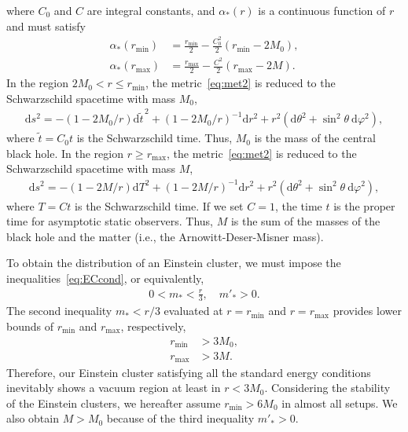 \documentclass[aps,11pt,nofootinbib,preprintnumbers,groupedaddress,superscriptaddress]{revtex4-2}
\begin{document}
where $C_0$ and $C$ are integral constants, 
and $\alpha_*(r)$ is a continuous function of $r$ and must satisfy
\begin{align}
\label{eq:alpbc1}
\alpha_*(r_{\mathrm{min}})&=\frac{r_{\mathrm{min}}}{2}-\frac{C_0^2}{2}(r_{\mathrm{min}}-2M_0),
\\
\label{eq:alpbc2}
\alpha_*(r_{\mathrm{max}})&=\frac{r_{\mathrm{max}}}{2}-\frac{C^2}{2} (r_{\mathrm{max}}-2M).
\end{align}
In the region $2M_0<r\le r_{\mathrm{min}}$, the metric~\eqref{eq:met2} is reduced to the Schwarzschild spacetime with mass $M_0$, 
\begin{align}
\mathrm{d}s^2=-\left(1-2M_0/r\right)\mathrm{d}\tilde{t}^{\,2}+\left(1-2M_0/r\right)^{-1}\mathrm{d}r^2+r^2 (\mathrm{d}\theta^2+\sin^2\theta \:\!\mathrm{d}\varphi^2),
\end{align}
where $\tilde{t}=C_0 t$ is the Schwarzschild time. Thus, $M_0$ is the mass of the central black hole. In the region $r\ge r_{\mathrm{max}}$, the metric~\eqref{eq:met2} is reduced to the Schwarzschild spacetime with mass $M$, 
\begin{align}
\mathrm{d}s^2=-\left(1-2M/r\right)\mathrm{d}T^2+\left(1-2M/r\right)^{-1}\mathrm{d}r^2+r^2 (\mathrm{d}\theta^2+\sin^2\theta \:\!\mathrm{d}\varphi^2),
\end{align}
where $T=C t$ is the Schwarzschild time.
If we set $C=1$, the time $t$ is the proper time for asymptotic static observers.
Thus, $M$ is the sum of the masses of the black hole and the matter 
(i.e., the Arnowitt-Deser-Misner mass).

To obtain the distribution of an Einstein cluster, we must impose the inequalities~\eqref{eq:ECcond}, or equivalently, 
\begin{align}
0<m_*<\frac{r}{3}, \quad m'_*>0.
\end{align}
The second inequality 
$m_*<r/3$ evaluated at $r=r_{\mathrm{min}}$ and $r=r_{\mathrm{max}}$ provides lower bounds of $r_{\mathrm{min}}$ and $r_{\mathrm{max}}$, respectively,
\begin{align}
r_{\mathrm{min}}&>3M_0,
\\
r_{\mathrm{max}}&>3M.
\end{align}
Therefore, our Einstein cluster satisfying all the standard energy conditions inevitably shows a vacuum region at least in $r<3M_0$. 
Considering the stability of the Einstein clusters, we hereafter assume $r_{\mathrm{min}}>6M_0$ in almost all setups. 
We also obtain $M>M_0$ because of 
the third inequality $m'_*>0$.
\end{document}
